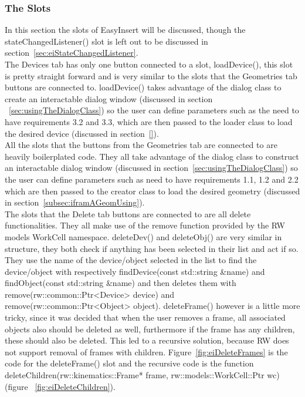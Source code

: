 \subsubsection{The Slots}
\label{sec:eiSlots}
In this section the slots of EasyInsert will be discussed, though the stateChangedListener() slot is left out to be discussed in section~\ref{sec:eiStateChangedListener}.\\

The Devices tab has only one button connected to a slot, loadDevice(), this slot is pretty straight forward and is very similar to the slots that the Geometries tab buttons are connected to. loadDevice() takes advantage of the dialog class to create an interactable dialog window (discussed in section ~\ref{sec:usingTheDialogClass}) so the user can define parameters such as the need to have requirements 3.2 and 3.3, which are then passed to the loader class to load the desired device (discussed in section~\ref{}).\\

All the slots that the buttons from the Geometries tab are connected to are heavily boilerplated code. They all take advantage of the dialog class to construct an interactable dialog window (discussed in section~\ref{sec:usingTheDialogClass}) so the user can define parameters such as need to have requirements 1.1, 1.2 and 2.2 which are then passed to the creator class to load the desired geometry (discussed in section~\ref{subsec:iframAGeomUsing}).\\

The slots that the Delete tab buttons are connected to are all delete functionalities. They all make use of the remove function provided by the RW models WorkCell namespace. deleteDev() and deleteObj() are very similar in structure, they both check if anything has been selected in their list and act if so. They use the name of the device/object selected in the list to find the device/object with respectively findDevice(const std::string \&name) and findObject(const std::string \&name) and then deletes them with remove(rw::common::Ptr<Device> device) and remove(rw::common::Ptr<Object> object).
deleteFrame() however is a little more tricky, since it was decided that when the user removes a frame, all associated objects also should be deleted as well, furthermore if the frame has any children, these should also be deleted. This led to a recursive solution, because RW does not support removal of frames with children. Figure~\ref{fig:eiDeleteFrames} is the code for the deleteFrame() slot and the recursive code is the function deleteChildren(rw::kinematics::Frame* frame, rw::models::WorkCell::Ptr wc) (figure ~\ref{fig:eiDeleteChildren}). 

